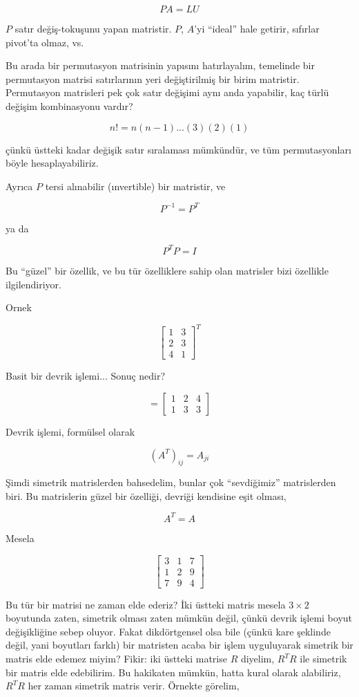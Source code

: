 \documentclass[12pt,fleqn]{article}\usepackage{../../common}
\begin{document}
$$ PA = LU $$

$P$ satır değiş-tokuşunu yapan matristir. $P$, $A$'yi ``ideal'' hale
getirir, sıfırlar pivot'ta olmaz, vs. 

Bu arada bir permutasyon matrisinin yapısını hatırlayalım, temelinde bir
permutasyon matrisi satırlarının yeri değiştirilmiş bir birim
matristir. Permutasyon matrisleri pek çok satır değişimi aynı anda
yapabilir, kaç türlü değişim kombinasyonu vardır? 

$$ n! = n(n-1)...(3)(2)(1) $$

çünkü üstteki kadar değişik satır sıralaması mümkündür, ve tüm
permutasyonları böyle hesaplayabiliriz. 

Ayrıca $P$ tersi alınabilir (ınvertible) bir matristir, ve 

$$ P^{-1} = P^T $$

ya da 

$$ P^TP = I $$

Bu ``güzel'' bir özellik, ve bu tür özelliklere sahip olan matrisler bizi
özellikle ilgilendiriyor.

Ornek

$$ 
\left[\begin{array}{rr}
1 & 3 \\
2 & 3 \\
4 & 1 
\end{array}\right]^T
 $$

Basit bir devrik işlemi... Sonuç nedir?

$$ =
\left[\begin{array}{rrr}
1 & 2 & 4 \\
1 & 3 & 3 
\end{array}\right]
 $$

Devrik işlemi, formülsel olarak 

$$ (A^T)_{ij} = A_{ji} $$

Şimdi simetrik matrislerden bahsedelim, bunlar çok ``sevdiğimiz''
matrislerden biri. Bu matrislerin güzel bir özelliği, devriği kendisine
eşit olması,

$$ A^T = A $$

Mesela

$$ 
\left[\begin{array}{rrr}
3 & 1 & 7 \\
1 & 2 & 9 \\
7 & 9 & 4
\end{array}\right]
$$

Bu tür bir matrisi ne zaman elde ederiz? İki üstteki matris mesela $3
\times 2$ boyutunda zaten, simetrik olması zaten mümkün değil, çünkü devrik
işlemi boyut değişikliğine sebep oluyor. Fakat dikdörtgensel olsa bile
(çünkü kare şeklinde değil, yani boyutları farklı) bir matristen acaba bir
işlem uyguluyarak simetrik bir matris elde edemez miyim? Fikir: iki üstteki
matrise $R$ diyelim, $R^TR$ ile simetrik bir matris elde edebilirim. Bu
hakikaten mümkün, hatta kural olarak alabiliriz, $R^TR$ her zaman simetrik
matris verir. Örnekte görelim, 
\end{document}
